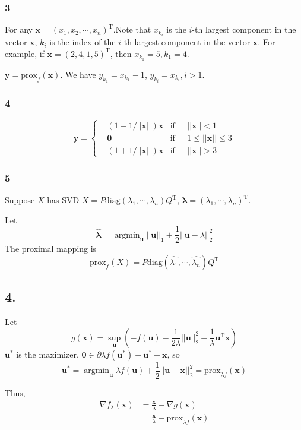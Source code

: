 \documentclass{article}
\begin{document}
\subsubsection*{3}
For any $\bm{x}=(x_{1},x_{2},\cdots,x_{n})^{\mathrm{T}}$.Note that $x_{k_{i}}$ is the $i$-th largest component in the vector $\bm{x}$, $k_{i}$ is the index of the $i$-th largest component in the vector $\bm{x}$. For example, if $\bm{x}=(2,4,1,5)^{\mathrm{T}}$, then $x_{k_{1}}=5, k_{1}=4$.

$\bm{y}=\mathrm{prox}_{f}(\bm{x})$. We have $y_{k_{1}}=x_{k_{1}}-1$, $y_{k_{i}}=x_{k_{i}},i>1$.

\subsubsection*{4}
$$\bm{y}=\left\{
\begin{aligned}
&(1-1/||\bm{x}||)\bm{x}&\mathrm{if}\ \ \ &||\bm{x}||<1\\
&\bm{0}&\mathrm{if}\ \ \ &1\leq||\bm{x}||\leq3\\
&(1+1/||\bm{x}||)\bm{x}&\mathrm{if}\ \ \ &||\bm{x}||>3
\end{aligned}
\right.
$$
\subsubsection*{5}

Suppose $X$ has SVD $X=P\mathrm{diag}(\lambda_{1},\cdots,\lambda_{n})Q^{\mathrm{T}}$,
$\bm{\lambda}=(\lambda_{1},\cdots,\lambda_{n})^{\mathrm{T}}$.

Let $$\hat{\bm{\lambda}}=\mathop{\arg\min}_{\bm{u}}||\bm{u}||_{1}+\frac{1}{2}||\bm{u}-\lambda||_{2}^{2}$$
The proximal mapping is $$\mathrm{prox}_{f}(X)=P\mathrm{diag}(\hat{\lambda_{1}},\cdots,\hat{\lambda_{n}})Q^{\mathrm{T}}$$
\subsection*{4.}
Let $$g(\bm{x})=\sup_{\bm{u}}(-f(\bm{u})-\frac{1}{2\lambda}||\bm{u}||_{2}^{2}+\frac{1}{\lambda}\bm{u}^{\mathrm{T}}\bm{x})$$
$\bm{u}^{*}$ is the maximizer, $\bm{0}\in \partial\lambda f(\bm{u}^{*})+\bm{u}^{*}-\bm{x}$, so
$$\bm{u}^{*}=\mathop{\arg\min}_{\bm{u}}\lambda f(\bm{u})+\frac{1}{2}||\bm{u}-\bm{x}||_{2}^{2}=\mathrm{prox}_{\lambda f}(\bm{x})$$

Thus,
\begin{align*}
\nabla f_{\lambda}(\bm{x})&=\frac{\bm{x}}{\lambda}-\nabla g(\bm{x})\\
&=\frac{\bm{x}}{\lambda}-\mathrm{prox}_{\lambda f}(\bm{x})
\end{align*}
\end{document}
